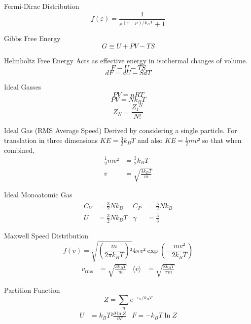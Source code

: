 \documentclass[avery5371,grid]{flashcards}
\begin{document}
\begin{flashcard}{Fermi-Dirac Distribution}
	\[ f(ε) = \frac{1}{e^{(ε-μ)/k_B T} + 1} \]
\end{flashcard}

\begin{flashcard}{Gibbs Free Energy}
	\[ G ≡ U + PV - TS \]
\end{flashcard}

\begin{flashcard}{Helmholtz Free Energy}
	Acts as effective energy in isothermal changes of volume.
	\[ F ≡ U - TS \]
	\[ dF = dU - S dT \]
\end{flashcard}

\begin{flashcard}{Ideal Gasses}
	\[ PV = nRT \]
	\[ PV = N k_B T \]
	\[ Z_N = \frac{Z₁^N}{N!} \]	
\end{flashcard}

\begin{flashcard}{Ideal Gas (RMS Average Speed)}
	Derived by considering a single particle. For translation in three
	dimensions $KE = \frac 32 k_B T$  and also $KE = \frac 12 mv²$ so that
	when combined,
	\begin{align*}
		\frac 12 mv² &= \frac 32 k_B T \\
		v &= \sqrt{\frac{3 k_B T}{m}}
	\end{align*}
\end{flashcard}

\begin{flashcard}{Ideal Monoatomic Gas}
	\begin{align*}
		C_V &= \frac 32 Nk_B
			& C_P &= \frac 52 Nk_B \\
		U &= \frac 32 Nk_B T
			& γ &= \frac 53
	\end{align*}
\end{flashcard}

\begin{flashcard}{Maxwell Speed Distribution}
	\[ f(v) = \sqrt{ (\frac{m}{2π k_B T})³ } 4πv² \exp(-\frac{mv²}{2k_B T}) \]
	\begin{align*}
		v_\mathrm{rms} &= \sqrt{\frac{3k_B T}{m}}
			& ⟨v⟩ &= \sqrt{\frac{8k_B T}{πm}}
	\end{align*}
\end{flashcard}

\begin{flashcard}{Partition Function}
	\[ Z = \sum_n e^{-ε_n / k_B T} \]
	\begin{align*}
		U &= k_B T² \frac{∂ \ln Z}{∂T}
			& F = -k_B T \ln Z
	\end{align*}
\end{flashcard}
\end{document}
